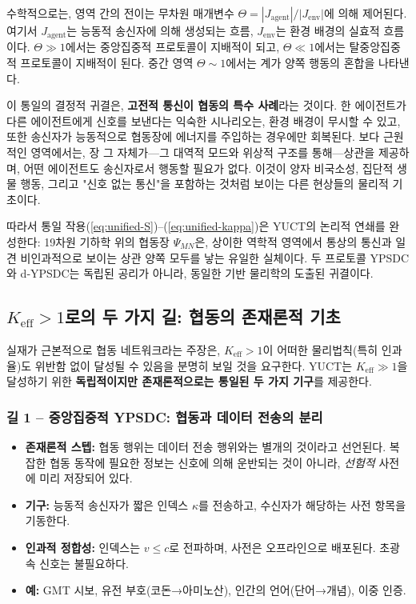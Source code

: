 \documentclass[12pt,a4paper]{article}
\begin{document}
	수학적으로는, 영역 간의 전이는 무차원 매개변수 \(\Theta = |J_{\mathrm{agent}}| / |J_{\mathrm{env}}|\)에 의해 제어된다. 여기서 \(J_{\mathrm{agent}}\)는 능동적 송신자에 의해 생성되는 흐름, \(J_{\mathrm{env}}\)는 환경 배경의 실효적 흐름이다. \(\Theta \gg 1\)에서는 중앙집중적 프로토콜이 지배적이 되고, \(\Theta \ll 1\)에서는 탈중앙집중적 프로토콜이 지배적이 된다. 중간 영역 \(\Theta \sim 1\)에서는 계가 양쪽 행동의 혼합을 나타낸다.
	
	이 통일의 결정적 귀결은, \textbf{고전적 통신이 협동의 특수 사례}라는 것이다. 한 에이전트가 다른 에이전트에게 신호를 보낸다는 익숙한 시나리오는, 환경 배경이 무시할 수 있고, 또한 송신자가 능동적으로 협동장에 에너지를 주입하는 경우에만 회복된다. 보다 근원적인 영역에서는, 장 그 자체가—그 대역적 모드와 위상적 구조를 통해—상관을 제공하며, 어떤 에이전트도 송신자로서 행동할 필요가 없다. 이것이 양자 비국소성, 집단적 생물 행동, 그리고 "신호 없는 통신"을 포함하는 것처럼 보이는 다른 현상들의 물리적 기초이다.
	
	따라서 통일 작용(\ref{eq:unified-S})–(\ref{eq:unified-kappa})은 YUCT의 논리적 연쇄를 완성한다: 19차원 기하학 위의 협동장 \(\Psi_{MN}\)은, 상이한 역학적 영역에서 통상의 통신과 일견 비인과적으로 보이는 상관 양쪽 모두를 낳는 유일한 실체이다. 두 프로토콜 YPSDC와 d‑YPSDC는 독립된 공리가 아니라, 동일한 기반 물리학의 도출된 귀결이다.
	
	\subsection{\(K_{\mathrm{eff}} > 1\)로의 두 가지 길: 협동의 존재론적 기초}
	\label{subsec:two-paths-ontology}
	
	실재가 근본적으로 협동 네트워크라는 주장은, \(K_{\mathrm{eff}} > 1\)이 어떠한 물리법칙(특히 인과율)도 위반함 없이 달성될 수 있음을 분명히 보일 것을 요구한다. YUCT는 \(K_{\mathrm{eff}} \gg 1\)을 달성하기 위한 \textbf{독립적이지만 존재론적으로는 통일된 두 가지 기구}를 제공한다.
	
	\subsubsection*{길 1 – 중앙집중적 YPSDC: 협동과 데이터 전송의 분리}
	\begin{itemize}[leftmargin=*]
		\item \textbf{존재론적 스텝:} 협동 행위는 데이터 전송 행위와는 별개의 것이라고 선언된다. 복잡한 협동 동작에 필요한 정보는 신호에 의해 운반되는 것이 아니라, \textit{선험적} 사전에 미리 저장되어 있다.
		\item \textbf{기구:} 능동적 송신자가 짧은 인덱스 \(\kappa\)를 전송하고, 수신자가 해당하는 사전 항목을 기동한다.
		\item \textbf{인과적 정합성:} 인덱스는 \(v \le c\)로 전파하며, 사전은 오프라인으로 배포된다. 초광속 신호는 불필요하다.
		\item \textbf{예:} GMT 시보, 유전 부호(코돈→아미노산), 인간의 언어(단어→개념), 이중 인증.
	\end{itemize}
	
\end{document}
